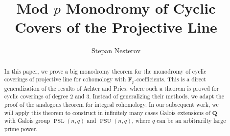 \documentclass{article}
\title{Mod $p$ Monodromy of Cyclic Covers of the Projective Line}
\author{Stepan Nesterov}
\theoremstyle{definition}
\DeclareMathOperator{\PSL}{\mathrm{PSL}}
\DeclareMathOperator{\PSU}{\mathrm{PSU}}
\DeclareMathOperator{\et}{\mathrm{\acute{e}t}}
\begin{document}
	\maketitle
	\begin{abstract}
		In this paper, we prove a big monodromy theorem for the monodromy of cyclic coverings of projective line for cohomology with $\mathbf{F}_p$-coefficients. This is a direct generalization of the results of Achter and Pries, where such a theorem is proved for cyclic coverings of degree $2$ and $3$. Instead of generalizing their methods, we adapt the proof of the analogous theorem for integral cohomology. In our subsequent work, we will apply this theorem to construct in infinitely many cases Galois extensions of $\mathbf{Q}$ with Galois group $\PSL(n,q)$ and $\PSU(n,q)$, where $q$ can be an arbitrarilty large prime power.
	\end{abstract}
\end{document}
